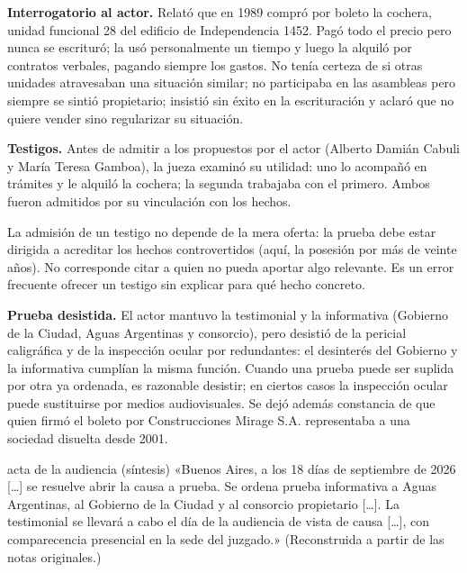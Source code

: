 \documentclass[12pt,oneside]{book}
\begin{document}
\textbf{Interrogatorio al actor.} Relató que en 1989 compró por boleto la cochera, unidad funcional 28 del edificio de Independencia 1452.
Pagó todo el precio pero nunca se escrituró; la usó personalmente un tiempo y luego la alquiló por contratos verbales, pagando siempre los gastos. No tenía certeza de si otras unidades atravesaban una situación similar; no participaba en las asambleas pero siempre se sintió propietario; insistió sin éxito en la escrituración y aclaró que no quiere vender sino regularizar su situación.

\textbf{Testigos.} Antes de admitir a los propuestos por el actor (Alberto Damián Cabuli y María Teresa Gamboa), la jueza examinó su utilidad: uno lo acompañó en trámites y le alquiló la cochera; la segunda trabajaba con el primero. Ambos fueron admitidos por su vinculación con los hechos.

\begin{importante}
La admisión de un testigo no depende de la mera oferta: la prueba debe estar dirigida a acreditar los hechos controvertidos (aquí, la posesión por más de veinte años). No corresponde citar a quien no pueda aportar algo relevante. Es un error frecuente ofrecer un testigo sin explicar para qué hecho concreto.
\end{importante}

\textbf{Prueba desistida.} El actor mantuvo la testimonial y la informativa (Gobierno de la Ciudad, Aguas Argentinas y consorcio), pero desistió de la pericial caligráfica y de la inspección ocular por redundantes: el desinterés del Gobierno y la informativa cumplían la misma función. Cuando una prueba puede ser suplida por otra ya ordenada, es razonable desistir; en ciertos casos la inspección ocular puede sustituirse por medios audiovisuales. Se dejó además constancia de que quien firmó el boleto por Construcciones Mirage S.A. representaba a una sociedad disuelta desde 2001.

\begin{regla}{acta de la audiencia (síntesis)}
«Buenos Aires, a los 18 días de septiembre de 2026 [\ldots] se resuelve abrir la causa a prueba. Se ordena prueba informativa a Aguas Argentinas, al Gobierno de la Ciudad y al consorcio propietario [\ldots]. La testimonial se llevará a cabo el día de la audiencia de vista de causa [\ldots], con comparecencia presencial en la sede del juzgado.» (Reconstruida a partir de las notas originales.)
\end{regla}
\end{document}
